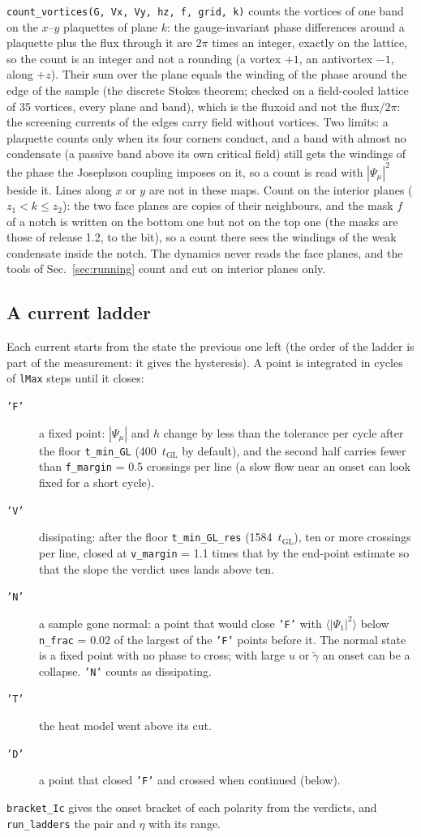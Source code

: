 \documentclass[11pt,a4paper]{article}
\newcommand{\tGL}{t_{\mathrm{GL}}}
\newcommand{\code}[1]{\texttt{#1}}
\newcommand{\gt}{\tilde\gamma}
\begin{document}
\code{count\_vortices(G, Vx, Vy, hz, f, grid, k)} counts the vortices of one band on the $x$--$y$ plaquettes of plane $k$: the
gauge-invariant phase differences around a plaquette plus the flux through it are $2\pi$ times an integer, exactly on the
lattice, so the count is an integer and not a rounding (a vortex $+1$, an antivortex $-1$, along $+z$). Their sum over the plane
equals the winding of the phase around the edge of the sample (the discrete Stokes theorem; checked on a field-cooled lattice of
35 vortices, every plane and band), which is the fluxoid and not the flux$/2\pi$: the screening currents of the edges carry
field without vortices. Two limits: a plaquette counts only when its four corners conduct, and a band with almost no condensate
(a passive band above its own critical field) still gets the windings of the phase the Josephson coupling imposes on it, so a
count is read with $|\Psi_\mu|^2$ beside it. Lines along $x$ or $y$ are not in these maps. Count on the interior planes
($z_1 < k \le z_2$): the two face planes are copies of their neighbours, and the mask $f$ of a notch is written on the bottom one
but not on the top one (the masks are those of release 1.2, to the bit), so a count there sees the windings of the weak condensate
inside the notch. The dynamics never reads the face planes, and the tools of Sec.~\ref{sec:running} count and cut on interior
planes only.

\subsection{A current ladder}

Each current starts from the state the previous one left (the order of the ladder is part of the measurement: it gives
the hysteresis). A point is integrated in cycles of \code{lMax} steps until it closes:
\begin{description}
\item[\code{'F'}] a fixed point: $|\Psi_\mu|$ and $h$ change by less than the tolerance per cycle after the floor
  \code{t\_min\_GL} (400~$\tGL$ by default), and the second half carries fewer than \code{f\_margin} = 0.5 crossings
  per line (a slow flow near an onset can look fixed for a short cycle).
\item[\code{'V'}] dissipating: after the floor \code{t\_min\_GL\_res} (1584~$\tGL$), ten or more crossings per line, closed
  at \code{v\_margin} = 1.1 times that by the end-point estimate so that the slope the verdict uses lands above ten.
\item[\code{'N'}] a sample gone normal: a point that would close \code{'F'} with $\langle|\Psi_1|^2\rangle$ below \code{n\_frac} =
  0.02 of the largest of the \code{'F'} points before it. The normal state is a fixed point with no phase to cross; with large
  $u$ or $\gt$ an onset can be a collapse. \code{'N'} counts as dissipating.
\item[\code{'T'}] the heat model went above its cut.
\item[\code{'D'}] a point that closed \code{'F'} and crossed when continued (below).
\end{description}
\code{bracket\_Ic} gives the onset bracket of each polarity from the verdicts, and \code{run\_ladders} the pair and
$\eta$ with its range.
\end{document}
